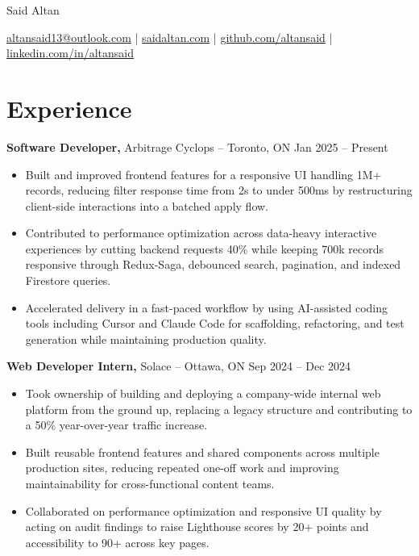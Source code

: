 \documentclass[11pt]{article}       %
\begin{document}
\centerline{\Huge Said Altan}

\vspace{10pt}

\centerline{\href{mailto:altansaid13@outlook.com}{altansaid13@outlook.com} | \href{https://saidaltan.com}{saidaltan.com} | \href{https://github.com/altansaid}{github.com/altansaid} | \href{https://www.linkedin.com/in/altansaid}{linkedin.com/in/altansaid}}


\vspace{5pt}
\section*{Experience}
\textbf{Software Developer,} {Arbitrage Cyclops} -- Toronto, ON \hfill Jan 2025 -- Present \\
\vspace{-9pt}
\begin{itemize}
  \item Built and improved frontend features for a responsive UI handling 1M+ records, reducing filter response time from 2s to under 500ms by restructuring client-side interactions into a batched apply flow.
  \item Contributed to performance optimization across data-heavy interactive experiences by cutting backend requests 40\% while keeping 700k records responsive through Redux-Saga, debounced search, pagination, and indexed Firestore queries.
  \item Accelerated delivery in a fast-paced workflow by using AI-assisted coding tools including Cursor and Claude Code for scaffolding, refactoring, and test generation while maintaining production quality.
\end{itemize}

\textbf{Web Developer Intern,} {Solace} -- Ottawa, ON \hfill Sep 2024 -- Dec 2024 \\
\vspace{-9pt}
\begin{itemize}
  \item Took ownership of building and deploying a company-wide internal web platform from the ground up, replacing a legacy structure and contributing to a 50\% year-over-year traffic increase.
  \item Built reusable frontend features and shared components across multiple production sites, reducing repeated one-off work and improving maintainability for cross-functional content teams.
  \item Collaborated on performance optimization and responsive UI quality by acting on audit findings to raise Lighthouse scores by 20+ points and accessibility to 90+ across key pages.
\end{itemize}
\end{document}
